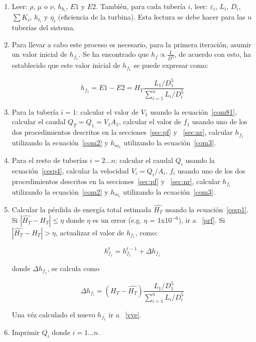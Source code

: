 \documentclass[10pt, oneside]{article}
\begin{document}
\begin{enumerate}
\item Leer: $\rho$, $\mu$ o $\nu$, $h_{b_i}$, $E1$ y $E2$. Tambi\'en, para cada tuber\'ia $i$, leer: $\varepsilon_i$, $L_i$, $D_i$, $\sum K_i$, $h_{t_i}$ y $\eta_i$ (eficiencia de la turbina). Esta lectura se debe hacer para las $n$ tuber\'ias del sistema.
\item Para llevar a cabo este proceso es necesario, para la primera iteraci\'on, asumir un valor inicial de $h_{f_1} $. Se ha encontrado que $h_f \propto \frac{L}{D^5}$, de acuerdo con esto, \cite{saldarriaga} ha establecido que este valor inicial de $h_{f_1}$ se puede expresar como:

\begin{equation} 
h_{f_1} = E1-E2 = H_T \frac{L_1 / D_1^5}{\sum_{i=1}^{n} L_i / D_i^5 }
\label{cpd1}
\end{equation}

\item \label{vve} Para la tuber\'ia $i=1$: calcular el valor de $V_1$ usando la ecuaci\'on~\ref{com81}, calcular el caudal $Q_T = Q_1 = V_1 A_1$, calcular el valor de $f_1$ usando uno de los dos procedimientos descritos en la secciones~\ref{sec:pf} y ~\ref{sec:nr}, calcular $h_{f_1}$ utilizando la ecuaci\'on~\ref{com2} y $h_{m_1}$  utilizando la ecuaci\'on~\ref{com3}.

\item Para el resto de tuber\'ias  $i = 2 ... n$: calcular el caudal $Q_i$ usando la ecuaci\'on~\ref{cesp4}, calcular la velocidad $V_i = Q_i /A_i$, $f_i$ usando uno de los dos procedimientos descritos en la secciones~\ref{sec:pf} y ~\ref{sec:nr}, calcular $h_{f_i}$ utilizando la ecuaci\'on~\ref{com2} y $h_{m_i}$  utilizando la ecuaci\'on~\ref{com3}.

\item Calcular la p\'erdida de energ\'ia total estimada $\hat{H_T}$ usando la ecuaci\'on~\ref{cesp1}. Si $|\hat{H_T} - H_T | \leq \eta$ donde $\eta$ es un error  (e.g. $\eta$ = 1x10$^{-6}$), ir a ~\ref{prf}. Si $|\hat{H_T} - H_T | > \eta$, actualizar el valor de $h_{f_1}$, como:

\begin{equation} 
h_{f_1}^t  = h_{f_1}^{t-1}  + \Delta h_{f_1}
\label{cpd2}
\end{equation}

donde $\Delta h_{f_1}$, se calcula como

\begin{equation} 
\Delta h_{f_i} = (H_T - \hat{H_T}) \frac{L_1 / D_1^5}{\sum_{i=1}^{n} L_i / D_i^5 }
\label{cpd3}
\end{equation}

Una v\'ez calculado el nuevo $h_{f_1}$ ir a ~\ref{vve}.

\item \label{prf} Imprimir $Q_i$ donde $i = 1 ... n$. 

\end{enumerate}
\end{document}
